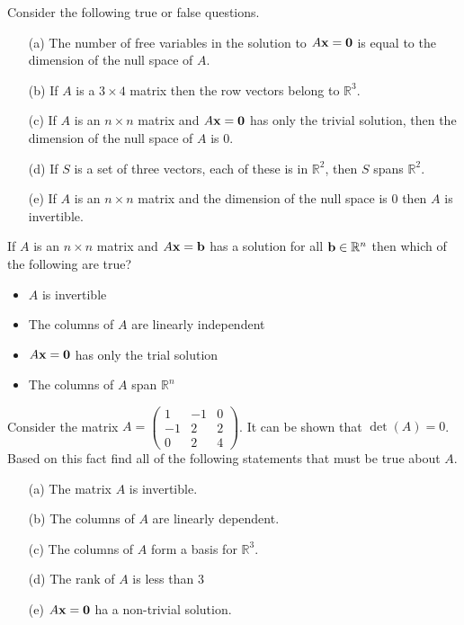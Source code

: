 \begin{problem}
    Consider the following true or false questions.
    \begin{enumerate}
        \item[(a)] The number of free variables in the solution to $A {\bf x} = {\bf 0}$ is equal
            to the dimension of the null space of $A$. 
        \item[(b)] If $A$ is a $3 \times 4$ matrix then the row vectors belong to
            $\mathbb{R}^3$. 
        \item[(c)] If $A$ is an $n \times n$ matrix and $A {\bf x} = {\bf 0}$ has only the trivial
            solution, then the dimension of the null space of $A$ is 0. 
        \item[(d)] If $S$ is a set of three vectors, each of these is in $\mathbb{R}^2$,
            then $S$ spans $\mathbb{R}^2$. 
        \item[(e)] If $A$ is an $n\times n$ matrix and the dimension of the null space is
            0 then $A$ is invertible. 
    \end{enumerate}
\end{problem}

\begin{problem}
    If $A$ is an $n \times n$ matrix and $A {\bf x} = {\bf b}$ has a solution for all ${\bf b} \in
    \mathbb{R}^n$ then which of the following are true?
    \begin{itemize}
        \item $A$ is invertible
        \item The columns of $A$ are linearly independent
        \item $A {\bf x} = {\bf 0}$ has only the trial solution
        \item The columns of $A$ span $\mathbb{R}^n$
    \end{itemize}
\end{problem}


\begin{problem}
    Consider the matrix $A = \begin{pmatrix} 1 & -1 & 0 \\ -1 & 2 & 2 \\ 0 & 2 & 4
    \end{pmatrix}$.  It can be shown that $\det(A) = 0$.  Based on this fact find all of
    the following statements that must be true about $A$.
    \begin{itemize}
        \item[(a)] The matrix $A$ is invertible.
        \item[(b)] The columns of $A$ are linearly dependent.
        \item[(c)] The columns of $A$ form a basis for $\mathbb{R}^3$.
        \item[(d)] The rank of $A$ is less than $3$
        \item[(e)] $A {\bf x} = {\bf 0}$ ha a non-trivial solution.
    \end{itemize}
\end{problem}

